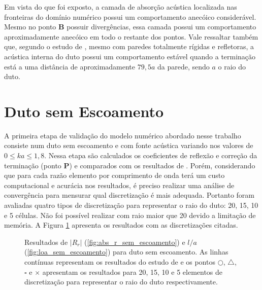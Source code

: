Em vista do que foi exposto, a camada de absorção acústica localizada nas fronteiras do domínio numérico
 possui um comportamento anecóico considerável. Mesmo no ponto \textbf{B} possuir divergências, 
 essa camada possui um comportamento aproximadamente anecóico em todo o restante dos pontos.
 Vale ressaltar também que, segundo o estudo de , 
 mesmo com paredes totalmente rígidas e refletoras, a acústica interna do duto possui 
 um comportamento estável quando a terminação está a uma distância de aproximadamente $79,5a$ da parede, sendo $a$ o raio do duto.  

\newpage
\section{Duto sem Escoamento}

A primeira etapa de validação do modelo numérico abordado nesse trabalho consiste num duto sem escoamento e com fonte acústica variando nos valores de $0 \leq ka \leq 1,8$. Nessa etapa são calculados os coeficientes de reflexão e correção da terminação (ponto \textbf{P}) e comparados com os resultados de . Porém, considerando que para cada razão elemento por comprimento de onda terá um custo computacional e acurácia nos resultados, é preciso realizar uma análise de convergência para mensurar qual discretização é mais adequada. Portanto foram avaliadas quatro tipos de discretização para representar o raio do duto: 20, 15, 10 e 5 células. Não foi possível realizar com raio maior que 20 devido a limitação de memória. A Figura \ref{fig:resultados_sem_escoamento} apresenta os resultados com as discretizações citadas.

\begin{figure}[h!]
\begin{subfigure}{\scaleA \textwidth}
  
\end{subfigure}%
\begin{subfigure}{\scaleA \textwidth}
  
\end{subfigure}
\caption[Resultados de $|R_{r}|$ e $l/a$ sem escoamento]{Resultados de $|R_{r}|$ (\ref{fig:abs_r_sem_escoamento}) e $l/a$ (\ref{fig:loa_sem_escoamento}) para duto sem escoamento. As linhas contínuas representam os resultados do estudo de  e os pontos $\bigcirc$, $\bigtriangleup$, $\square$ e $\times$ apresentam os resultados para 20, 15, 10 e 5 elementos de discretização para representar o raio do duto respectivamente.}
\label{fig:resultados_sem_escoamento}
\end{figure}

